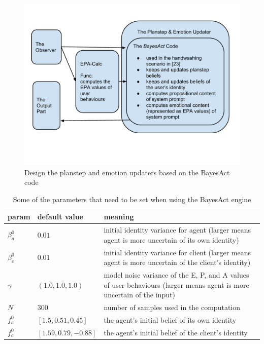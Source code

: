 \begin{figure}[htp]
\centering
\includegraphics[trim = 4mm 30mm 5mm 15mm, clip, width=0.9\linewidth]{fig/fig-updater.pdf}
\caption{Design the planstep and emotion updaters based on the BayesAct code}
\label{fig:updater}
\end{figure}


\begin{table}
\centering
\caption{Some of the parameters that need to be set when using the BayesAct engine}
\label{table:bayesact-param}
\begin{tabular}{| l | l | p{9.4cm} |}
\hline
param & default value & meaning \\ \hline
$\beta_{a}^{0}$ & $0.01$ & initial identity variance for agent (larger means agent is more uncertain of its own identity) \\ \hline
$\beta_{c}^{0}$ & $0.01$ & initial identity variance for client (larger means agent is more uncertain of the client's identity) \\ \hline
$\gamma$ & $(1.0, 1.0, 1.0)$ & model noise variance of the E, P, and A values of user behaviours (larger means agent is more uncertain of the input) \\ \hline
$N$ & $300$ & number of samples used in the computation \\ \hline
$f_a^{0}$ & $[1.5,0.51,0.45]$ & the agent's initial belief of its own identity \\ \hline
$f_c^{0}$ & $[1.59,0.79,-0.88]$ & the agent's initial belief of the client's identity \\ \hline
\end{tabular}
\end{table}

